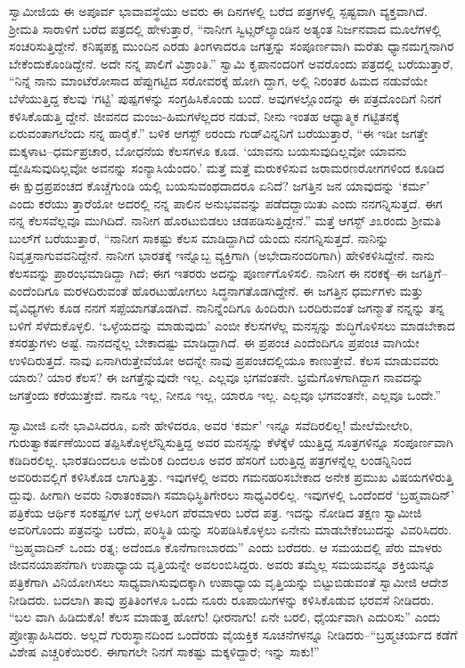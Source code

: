 ಸ್ವಾಮೀಜಿಯ ಈ ಅಪೂರ್ವ ಭಾವಾವಸ್ಥೆಯು ಅವರು ಈ ದಿನಗಳಲ್ಲಿ ಬರೆದ ಪತ್ರಗಳಲ್ಲಿ ಸ್ಪಷ್ಟವಾಗಿ ವ್ಯಕ್ತವಾಗಿದೆ. ಶ್ರೀಮತಿ ಸಾರಾಳಿಗೆ ಬರೆದ ಪತ್ರದಲ್ಲಿ ಹೇಳುತ್ತಾರೆ, “ನಾನೀಗ ಸ್ವಿಟ್ಸರ್​ಲ್ಯಾಂಡಿನ ಅತ್ಯಂತ ನಿರ್ಜನವಾದ ಮೂಲೆಗಳಲ್ಲಿ ಸಂಚರಿಸುತ್ತಿದ್ದೇನೆ. ಕನಿಷ್ಠಪಕ್ಷ ಮುಂದಿನ ಎರಡು ತಿಂಗಳಾದರೂ ಜಗತ್ತನ್ನು ಸಂಪೂರ್ಣವಾಗಿ ಮರೆತು ಧ್ಯಾನಮಗ್ನನಾಗಿರ ಬೇಕೆಂದುಕೊಂಡಿದ್ದೇನೆ. ಅದೇ ನನ್ನ ಪಾಲಿಗೆ ವಿಶ್ರಾಂತಿ.” ಸ್ವಾಮಿ ಕೃಪಾನಂದರಿಗೆ ಅವರೊಂದು ಪತ್ರದಲ್ಲಿ ಬರೆಯುತ್ತಾರೆ, “ನಿನ್ನೆ ನಾನು ಮಾಂಟೆರೋಸಾದ ಹೆಪ್ಪುಗಟ್ಟಿದ ಸರೋವರಕ್ಕೆ ಹೋಗಿ ದ್ದಾಗ, ಅಲ್ಲಿ ನಿರಂತರ ಹಿಮದ ನಡುವೆಯೇ ಬೆಳೆಯುತ್ತಿದ್ದ ಕೆಲವು ‘ಗಟ್ಟಿ’ ಪುಷ್ಪಗಳನ್ನು ಸಂಗ್ರಹಿಸಿಕೊಂಡು ಬಂದೆ. ಅವುಗಳಲ್ಲೊಂದನ್ನು ಈ ಪತ್ರದೊಂದಿಗೆ ನಿನಗೆ ಕಳಿಸಿಕೊಡುತ್ತಿ ದ್ದೇನೆ. ಜೀವನದ ಮಂಜು-ಹಿಮಗಳೆಲ್ಲದರ ನಡುವೆ, ನೀನು ಇಂತಹ ಆಧ್ಯಾತ್ಮಿಕ ಗಟ್ಟಿತನಕ್ಕೆ ಏರುವಂತಾಗಲೆಂದು ನನ್ನ ಹಾರೈಕೆ.” ಬಳಿಕ ಆಗಸ್ಟ್ ೮ರಂದು ಗುಡ್​ವಿನ್ನನಿಗೆ ಬರೆಯುತ್ತಾರೆ, “ಈ ಇಡೀ ಜಗತ್ತೇ ಮಕ್ಕಳಾಟ–ಧರ್ಮಪ್ರಚಾರ, ಬೋಧನೆಯ ಕೆಲಸಗಳೂ ಕೂಡ. ‘ಯಾವನು ಬಯಸುವುದಿಲ್ಲವೋ ಯಾವನು ದ್ವೇಷಿಸುವುದಿಲ್ಲವೋ ಅವನನ್ನು ಸಂನ್ಯಾಸಿಯೆಂದರಿ.’ ಮತ್ತೆ ಮತ್ತೆ ಮರುಕಳಿಸುವ ಜರಾಮರಣರೋಗಗಳಿಂದ ಕೂಡಿದ ಈ ಕ್ಷುದ್ರಪ್ರಪಂಚದ ಕೊಚ್ಚೆಗುಂಡಿ ಯಲ್ಲಿ ಬಯಸುವಂಥದಾದರೂ ಏನಿದೆ? ಜಗತ್ತಿನ ಜನ ಯಾವುದನ್ನು ‘ಕರ್ಮ’ ಎಂದು ಕರೆಯು ತ್ತಾರೆಯೋ ಅದರಲ್ಲಿ ನನ್ನ ಪಾಲಿನ ಅನುಭವವನ್ನು ಪಡೆದದ್ದಾಯಿತು ಎಂದು ನನಗನ್ನಿಸುತ್ತದೆ. ಈಗ ನನ್ನ ಕೆಲಸವೆಲ್ಲವೂ ಮುಗಿದಿದೆ. ನಾನೀಗ ಹೊರಟುಬಿಡಲು ಚಡಪಡಿಸುತ್ತಿದ್ದೇನೆ.” ಮತ್ತೆ ಆಗಸ್ಟ್ ೨೩ರಂದು ಶ್ರೀಮತಿ ಬುಲ್​ಗೆ ಬರೆಯುತ್ತಾರೆ, “ನಾನೀಗ ಸಾಕಷ್ಟು ಕೆಲಸ ಮಾಡಿದ್ದಾಗಿದೆ ಯೆಂದು ನನಗನ್ನಿಸುತ್ತದೆ. ನಾನಿನ್ನು ನಿವೃತ್ತನಾಗುವವನಿದ್ದೇನೆ. ನಾನೀಗ ಭಾರತಕ್ಕೆ ಇನ್ನೊಬ್ಬ ವ್ಯಕ್ತಿಗಾಗಿ (ಅಭೇದಾನಂದರಿಗಾಗಿ) ಹೇಳಿಕಳಿಸಿದ್ದೇನೆ. ನಾನು ಕೆಲಸವನ್ನು ಪ್ರಾರಂಭಮಾಡಿದ್ದಾ ಗಿದೆ; ಈಗ ಇತರರು ಅದನ್ನು ಪೂರ್ಣಗೊಳಿಸಲಿ. ನಾನೀಗ ಈ ನರಕಕ್ಕೆ–ಈ ಜಗತ್ತಿಗೆ– ಎಂದೆಂದಿಗೂ ಮರಳದಿರುವಂತೆ ಹೊರಟುಹೋಗಲು ಸಿದ್ಧನಾಗತೊಡಗಿದ್ದೇನೆ. ಈ ಜಗತ್ತಿನ ಧರ್ಮಗಳು ಮತ್ತು ವೈವಿಧ್ಯಗಳು ಕೂಡ ನನಗೆ ಸಪ್ಪೆಯಾಗತೊಡಗಿವೆ. ನಾನಿನ್ನೆಂದಿಗೂ ಹಿಂದಿರುಗಿ ಬರದಿರುವಂತೆ ಜಗನ್ಮಾತೆ ನನ್ನನ್ನು ತನ್ನ ಬಳಿಗೆ ಸೆಳೆದುಕೊಳ್ಳಲಿ. ‘ಒಳ್ಳೆಯದನ್ನು ಮಾಡುವುದು’ ಎಂಬೀ ಕೆಲಸಗಳೆಲ್ಲ ಮನಸ್ಸನ್ನು ಶುದ್ಧಿಗೊಳಿಸಲು ಮಾಡಬೇಕಾದ ಕಸರತ್ತುಗಳು ಅಷ್ಟೆ. ನಾನದನ್ನೆಲ್ಲ ಬೇಕಾದಷ್ಟು ಮಾಡಿದ್ದಾಗಿದೆ. ಈ ಪ್ರಪಂಚ ಎಂದೆಂದಿಗೂ ಪ್ರಪಂಚ ವಾಗಿಯೇ ಉಳಿದಿರುತ್ತದೆ. ನಾವು ಏನಾಗಿರುತ್ತೇವೆಯೋ ಅದನ್ನೇ ನಾವು ಪ್ರಪಂಚದಲ್ಲಿಯೂ ಕಾಣುತ್ತೇವೆ. ಕೆಲಸ ಮಾಡುವವರು ಯಾರು? ಯಾರ ಕೆಲಸ? ಈ ಜಗತ್ತೆನ್ನುವುದೇ ಇಲ್ಲ. ಎಲ್ಲವೂ ಭಗವಂತನೇ. ಭ್ರಮೆಗೊಳಗಾಗಿದ್ದಾಗ ನಾವದನ್ನು ಜಗತ್ತೆಂದು ಕರೆಯುತ್ತೇವೆ. ನಾನೂ ಇಲ್ಲ, ನೀನೂ ಇಲ್ಲ, ಯಾರೂ ಇಲ್ಲ. ಎಲ್ಲವೂ ಭಗವಂತನೇ, ಎಲ್ಲವೂ ಒಂದೇ.”

ಸ್ವಾಮೀಜಿ ಏನೇ ಭಾವಿಸಿದರೂ, ಏನೇ ಹೇಳಿದರೂ, ಅವರ ‘ಕರ್ಮ’ ಇನ್ನೂ ಸವೆದಿರಲಿಲ್ಲ! ಮೇಲೆಮೇಲೇರಿ, ಗುರುತ್ವಾಕರ್ಷಣೆಯಿಂದ ತಪ್ಪಿಸಿಕೊಳ್ಳಲೆನ್ನಿಸುತ್ತಿದ್ದ ಅವರ ಮನಸ್ಸನ್ನು ಕೆಳೆಕ್ಕೆಳೆ ಯುತ್ತಿದ್ದ ಸೂತ್ರಗಳಿನ್ನೂ ಸಂಪೂರ್ಣವಾಗಿ ಕಡಿದಿರಲಿಲ್ಲ. ಭಾರತದಿಂದಲೂ ಅಮೆರಿಕ ದಿಂದಲೂ ಅವರ ಹೆಸರಿಗೆ ಬರುತ್ತಿದ್ದ ಪತ್ರಗಳನ್ನೆಲ್ಲ ಲಂಡನ್ನಿನಿಂದ ಅವರಿರುವಲ್ಲಿಗೆ ಕಳಿಸಿಕೊಡ ಲಾಗುತ್ತಿತ್ತು. ಇವುಗಳಲ್ಲಿ ಅವರು ಗಮನಹರಿಸಬೇಕಾದ ಅನೇಕ ಪ್ರಮುಖ ವಿಷಯಗಳಿರುತ್ತಿ ದ್ದುವು. ಹೀಗಾಗಿ ಅವರು ನಿರಾತಂಕವಾಗಿ ಸಮಾಧಿಸ್ಥಿತಿಗೇರಲು ಸಾಧ್ಯವಿರಲಿಲ್ಲ. ಇವುಗಳಲ್ಲಿ ಒಂದೆಂದರೆ ‘ಬ್ರಹ್ಮವಾದಿನ್​’ ಪತ್ರಿಕೆಯ ಆರ್ಥಿಕ ಸಂಕಷ್ಟಗಳ ಬಗ್ಗೆ ಅಳಸಿಂಗ ಪೆರಮಾಳರು ಬರೆದ ಪತ್ರ. ಇದನ್ನು ನೋಡಿದ ತಕ್ಷಣ ಸ್ವಾಮೀಜಿ ಅವರಿಗೊಂದು ಪತ್ರವನ್ನು ಬರೆದು, ಪರಿಸ್ಥಿತಿ ಯನ್ನು ಸರಿಪಡಿಸಿಕೊಳ್ಳಲು ಏನೇನು ಮಾಡಬೇಕೆಂಬುದನ್ನು ವಿವರಿಸಿದರು. “ಬ್ರಹ್ಮವಾದಿನ್ ಒಂದು ರತ್ನ; ಅದೆಂದೂ ಕೊನೆಗಾಣಬಾರದು” ಎಂದು ಬರೆದರು. ಆ ಸಮಯದಲ್ಲಿ ಪೆರು ಮಾಳರು ಜೀವನಯಾಪನೆಗಾಗಿ ಉಪಾಧ್ಯಾಯ ವೃತ್ತಿಯನ್ನೇ ಅವಲಂಬಿಸಿದ್ದರು. ಅವರು ತಮ್ಮೆಲ್ಲ ಸಮಯವನ್ನೂ ಶಕ್ತಿಯನ್ನೂ ಪತ್ರಿಕೆಗಾಗಿ ವಿನಿಯೋಗಿಸಲು ಸಾಧ್ಯವಾಗಿಸುವುದಕ್ಕಾಗಿ ಉಪಾಧ್ಯಾಯ ವೃತ್ತಿಯನ್ನು ಬಿಟ್ಟುಬಿಡುವಂತೆ ಸ್ವಾಮೀಜಿ ಆದೇಶ ನೀಡಿದರು. ಬದಲಾಗಿ ತಾವು ಪ್ರತಿತಿಂಗಳೂ ಒಂದು ನೂರು ರೂಪಾಯಿಗಳನ್ನು ಕಳಿಸಿಕೊಡುವ ಭರವಸೆ ನೀಡಿದರು. “ಬಲ ವಾಗಿ ಹಿಡಿದುಕೊ! ಕೆಲಸ ಮಾಡುತ್ತ ಹೋಗು! ಧೀರನಾಗು! ಏನೇ ಬರಲಿ, ಧೈರ್ಯವಾಗಿ ಎದುರಿಸು” ಎಂದು ಪ್ರೋತ್ಸಾಹಿಸಿದರು. ಅಲ್ಲದೆ ಗುರುಸ್ಥಾನದಿಂದ ಒಂದೆರಡು ವೈಯಕ್ತಿಕ ಸೂಚನೆಗಳನ್ನೂ ನೀಡಿದರು–“ಬ್ರಹ್ಮಚರ್ಯದ ಕಡೆಗೆ ವಿಶೇಷ ಎಚ್ಚರಿಕೆಯಿರಲಿ. ಈಗಾಗಲೇ ನಿನಗೆ ಸಾಕಷ್ಟು ಮಕ್ಕಳಿದ್ದಾರೆ; ಇನ್ನು ಸಾಕು!”

